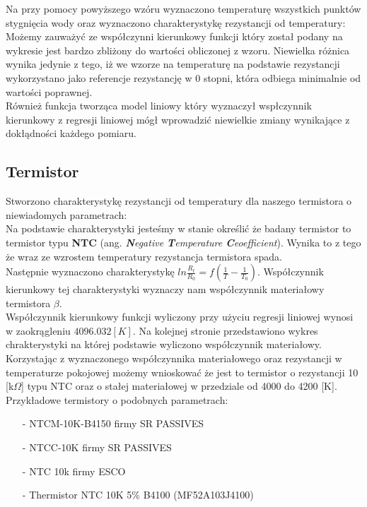 \documentclass[11pt]{article}
\begin{document}
    \newpage
    Na przy pomocy powyższego wzóru wyznaczono temperaturę wszystkich punktów stygnięcia wody oraz wyznaczono charakterystykę
    rezystancji od temperatury:\\
    \noindent{}
    \indent Możemy zauważyć ze współczynni kierunkowy funkcji który został podany na wykresie jest bardzo zbliżony do wartości obliczonej z wzoru. Niewielka
    różnica wynika jedynie z tego, iż we wzorze na temperaturę na podstawie rezystancji wykorzystano jako referencje rezystancję w 0 stopni, która odbiega
    minimalnie od wartości poprawnej.\\
    \indent Również funkcja tworząca model liniowy który wyznaczył wspłczynnik kierunkowy z regresji liniowej mógł wprowadzić
    niewielkie zmiany wynikające z dokłądności każdego pomiaru.
    \newpage
    \subsection{Termistor}
    \par Stworzono charakterystykę rezystancji od temperatury dla naszego termistora o niewiadomych parametrach:\\
    \noindent{}
    \indent Na podstawie charakterystyki jesteśmy w stanie określić że badany termistor to termistor
    typu \textbf{NTC} (ang. \textit{\textbf{N}egative \textbf{T}emperature \textbf{C}eoefficient}). Wynika to z tego że wraz ze wzrostem temperatury
    rezystancja termistora spada.\\
    \indent Następnie wyznaczono charakterystykę $ln\frac{R_t}{R_0}=f(\frac{1}{T}-\frac{1}{T_0})$. Współczynnik kierunkowy tej charakterystyki
    wyznaczy nam współczynnik materiałowy termistora \textbf{$\beta$}.\\
    \indent Współczynnik kierunkowy funkcji wyliczony przy użyciu regresji liniowej wynosi w zaokrągleniu  $4096.032 [K]$. Na kolejnej stronie
    przedstawiono wykres chrakterystyki na której podstawie wyliczono współczynnik materiałowy.
    \newpage
    \noindent{}
    \indent Korzystając z wyznaczonego współczynnika materiałowego oraz rezystancji w temperaturze pokojowej możemy wnioskować że jest to termistor o rezystancji 10 [k$\Omega$] typu NTC
    oraz o stałej materiałowej w przedziale od 4000 do 4200 [K]. Przykładowe termistory o podobnych parametrach:
    \begin{itemize}
        \item[-] NTCM-10K-B4150 firmy SR PASSIVES
        \item[-] NTCC-10K firmy SR PASSIVES
        \item[-] NTC 10k firmy ESCO
        \item[-] Thermistor NTC 10K 5\% B4100 (MF52A103J4100)
    \end{itemize}
    \newpage
\end{document}
